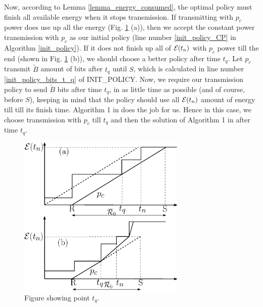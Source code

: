 Now, according to Lemma \ref{lemma_energy_consumed}, the optimal policy must finish all available energy when it stops transmission. If transmitting with $p_c$ power does use up all the energy (Fig. \ref{straight} (a)), then we accept the constant power transmission with $p_c$ as our initial policy (line number \ref{init_policy_CP} in Algorithm \ref{init_policy}). If it does not finish up all of $\mathcal{E}(t_n)$ with $p_c$ power till the end (shown in Fig. \ref{straight} (b)), we should choose a better policy after time $t_q$. Let $p_c$ transmit $\widetilde{B}$ amount of bits after $t_q$ until $S$, which is calculated in line number \ref{init_policy_bits_t_q} of INIT\_POLICY. Now, we require our transmission policy to send $\widetilde{B}$ bits after time $t_q$, in as little time as possible (and of course, before $S$), keeping in mind that the policy should use all $\mathcal{E}(t_n)$ amount of energy till till its finish time. Algorithm 1 in \cite{Yang} does the job for us. Hence in this case, we choose transmission with $p_c$ till $t_q$ and then the solution of Algorithm 1 in \cite{Yang} after time $t_q$. 

\begin{figure}
\centering
  \centerline{\includegraphics[width=8cm]{straight.eps}}
\caption{Figure showing point $t_q$.}\label{straight}
\end{figure}

